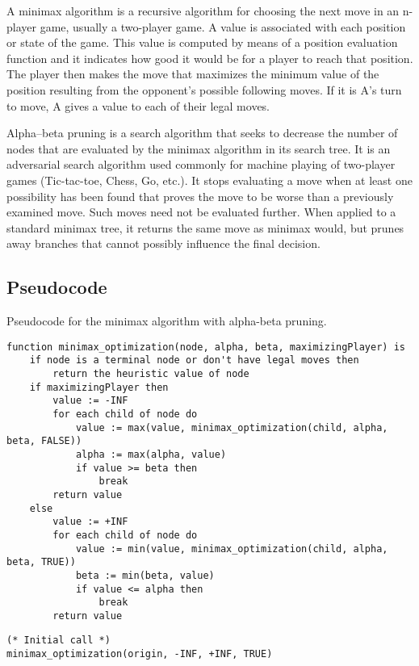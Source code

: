 \documentclass[twoside,10pt]{article}
\begin{document}
A minimax algorithm is a recursive algorithm for choosing the next move in an n-player game, usually a two-player game. A value is associated with each position or state of the game. This value is computed by means of a position evaluation function and it indicates how good it would be for a player to reach that position. The player then makes the move that maximizes the minimum value of the position resulting from the opponent's possible following moves. If it is A's turn to move, A gives a value to each of their legal moves.
\vspace{0.3cm}

Alpha–beta pruning is a search algorithm that seeks to decrease the number of nodes that are evaluated by the minimax algorithm in its search tree. It is an adversarial search algorithm used commonly for machine playing of two-player games (Tic-tac-toe, Chess, Go, etc.). It stops evaluating a move when at least one possibility has been found that proves the move to be worse than a previously examined move. Such moves need not be evaluated further. When applied to a standard minimax tree, it returns the same move as minimax would, but prunes away branches that cannot possibly influence the final decision.

\newpage

\subsection*{Pseudocode}

Pseudocode for the minimax algorithm with alpha-beta pruning.

\begin{tcolorbox}[boxrule=0pt]
    \begin{verbatim}
function minimax_optimization(node, alpha, beta, maximizingPlayer) is
    if node is a terminal node or don't have legal moves then
        return the heuristic value of node
    if maximizingPlayer then
        value := -INF
        for each child of node do
            value := max(value, minimax_optimization(child, alpha, beta, FALSE))
            alpha := max(alpha, value)
            if value >= beta then
                break 
        return value
    else
        value := +INF
        for each child of node do
            value := min(value, minimax_optimization(child, alpha, beta, TRUE))
            beta := min(beta, value)
            if value <= alpha then
                break 
        return value
    \end{verbatim}
\end{tcolorbox}
\begin{tcolorbox}[boxrule=0pt]
    \begin{verbatim}
(* Initial call *)
minimax_optimization(origin, -INF, +INF, TRUE)
\end{verbatim}
\end{tcolorbox}
\end{document}
